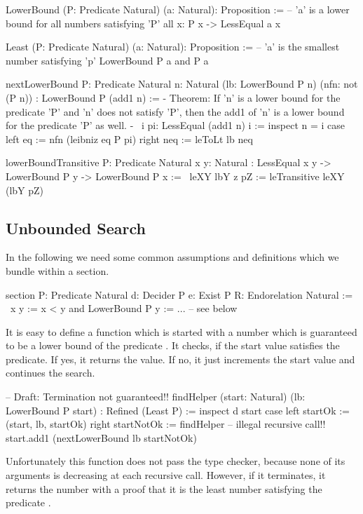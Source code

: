 \begin{alba}
    LowerBound (P: Predicate Natural) (a: Natural): Proposition :=
            -- 'a' is a lower bound for all numbers satisfying 'P'
        all {x}: P x -> LessEqual a x

    Least (P: Predicate Natural) (a: Natural): Proposition :=
            -- 'a' is the smallest number satisfying 'p'
        LowerBound P a and P a


    nextLowerBound
        {P: Predicate Natural}
        {n: Natural}
        (lb: LowerBound P n)
        (nfn: not (P n))
        : LowerBound P (add1 n)
    :=
        {- Theorem: If 'n' is a lower bound for the predicate 'P' and 'n'
           does not satisfy 'P', then the add1 of 'n' is a lower bound
           for the predicate 'P' as well. -}
        \ i pi: LessEqual (add1 n) i :=
            inspect n = i case
                left eq :=
                    nfn (leibniz eq P pi)
                right neq :=
                    leToLt lb neq


    lowerBoundTransitive
        {P: Predicate Natural}
        {x y: Natural}
        : LessEqual x y -> LowerBound P y -> LowerBound P x
    :=
        \ leXY lbY {z} pZ :=
            leTransitive leXY (lbY pZ)
\end{alba}






\vskip 5mm
\subsection{Unbounded Search}

In the following we need some common assumptions and definitions which we
bundle within a section.

\begin{alba}
    section
        P: Predicate Natural
        d: Decider P
        e: Exist P
        R: Endorelation Natural :=
            \ x y := x < y and LowerBound P y
    :=
        ...  -- see below
\end{alba}

It is easy to define a function  which is started with a number
which is guaranteed to be a lower bound of the predicate . It checks, if
the start value satisfies the predicate. If yes, it returns the value. If no, it
just increments the start value and continues the search.
%
\begin{alba}
    -- Draft: Termination not guaranteed!!
    findHelper (start: Natural) (lb: LowerBound P start) : Refined (Least P) :=
        inspect d start case
            left startOk :=
                (start, lb, startOk)
            right startNotOk :=
                findHelper  -- illegal recursive call!!
                    start.add1
                    (nextLowerBound lb startNotOk)
\end{alba}
%
Unfortunately this function does not pass the type checker, because none of its
arguments is decreasing at each recursive call. However, if it terminates, it
returns the number with a proof that it is the least number satisfying the
predicate .

